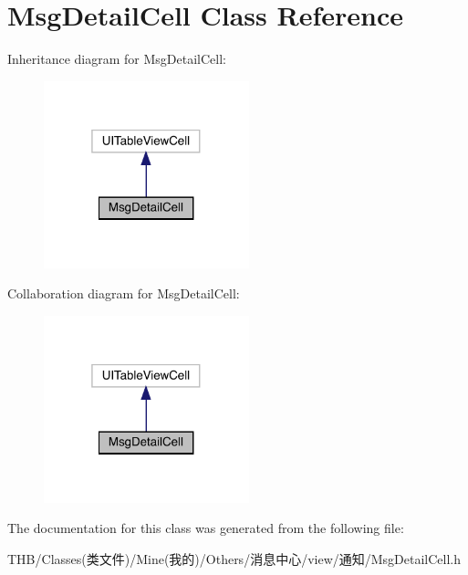 \hypertarget{interface_msg_detail_cell}{}\section{Msg\+Detail\+Cell Class Reference}
\label{interface_msg_detail_cell}


Inheritance diagram for Msg\+Detail\+Cell\+:\nopagebreak
\begin{figure}[H]
\begin{center}
\leavevmode
\includegraphics[width=169pt]{interface_msg_detail_cell__inherit__graph}
\end{center}
\end{figure}


Collaboration diagram for Msg\+Detail\+Cell\+:\nopagebreak
\begin{figure}[H]
\begin{center}
\leavevmode
\includegraphics[width=169pt]{interface_msg_detail_cell__coll__graph}
\end{center}
\end{figure}


The documentation for this class was generated from the following file\+:\begin{DoxyCompactItemize}
\item 
T\+H\+B/\+Classes(类文件)/\+Mine(我的)/\+Others/消息中心/view/通知/Msg\+Detail\+Cell.\+h\end{DoxyCompactItemize}
